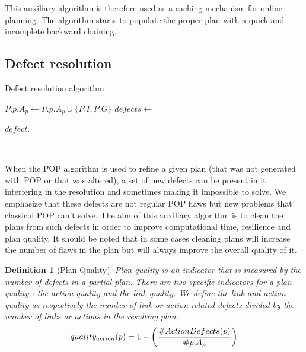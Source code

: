 \documentclass[]{article}
\newtheorem{definition}{Definition}
\begin{document}
This auxiliary algorithm is therefore used as a caching mechanism for
online planning. The algorithm starts to populate the proper plan with a
quick and incomplete backward chaining.

\hypertarget{defects}{\subsection{Defect resolution}\label{defects}}

\begin{algorithm}\caption{Defect resolution algorithm}\label{defectresolution}\begin{algorithmic}[1]

\State {}
\State {}
\State \(P.p.A_p \gets P.p.A_p \cup \{P.I, P.G\}\)
\State \(defects \gets\) 
\State {} \EndFunction

 \State \(defect.\)
 \EndFor
\EndFunction

 \State \Return {}
\(+\)  \EndFunction

\end{algorithmic}\end{algorithm}

When the POP algorithm is used to refine a given plan (that was not
generated with POP or that was altered), a set of new defects can be
present in it interfering in the resolution and sometimes making it
impossible to solve. We emphasize that these defects are not regular POP
flaws but new problems that classical POP can't solve. The aim of this
auxiliary algorithm is to clean the plans from such defects in order to
improve computational time, resilience and plan quality. It should be
noted that in some cases cleaning plans will increase the number of
flaws in the plan but will always improve the overall quality of it.

\begin{definition}[Plan Quality]

Plan quality is an indicator that is measured by the number of defects
in a partial plan. There are two specific indicators for a plan quality
: the action quality and the link quality. We define the link and action
quality as respectively the number of link or action related defects
divided by the number of links or actions in the resulting plan.
\[quality_{action}(p) =  1 - \left( \#ActionDefects(p) \over \#p.A_p \right)\]

\end{definition}
\end{document}
